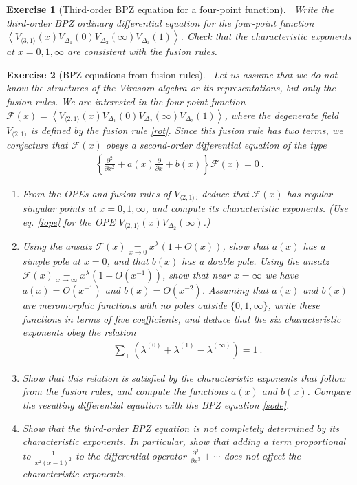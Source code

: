 \documentclass[12pt, a4paper, notitlepage, twoside]{report}
\numberwithin{equation}{section}
\theoremstyle{break}
\newtheorem{exo}{Exercise}[chapter]
\begin{document}
\begin{exo}[Third-order BPZ equation for a four-point function]
 ~\label{exotbf}
 Write the third-order BPZ ordinary differential equation for the four-point function $\left\langle V_{\langle 3,1 \rangle}(x)V_{\Delta_1}(0)V_{\Delta_2}(\infty)V_{\Delta_3}(1)\right\rangle $.
Check that the characteristic exponents at $x=0,1,\infty$ are consistent with the fusion rules. 
\end{exo}

\begin{exo}[BPZ equations from fusion rules]
 ~\label{exoefr}
Let us assume that we do not know the structures of the Virasoro algebra or its representations, but only the fusion rules. We are interested in the four-point function $\mathcal{F}(x) = \left\langle V_{\langle 2,1 \rangle}(x)V_{\Delta_1}(0)V_{\Delta_2}(\infty)V_{\Delta_3}(1)\right\rangle$, where the degenerate field $V_{\langle 2,1 \rangle}$ is defined by the fusion rule \eqref{rot}. Since this fusion rule has two terms, we conjecture that $\mathcal{F}(x)$ obeys a second-order differential equation of the type 
\begin{align}
 \left\{\frac{\partial^2}{\partial x^2} + a(x) \frac{\partial}{\partial x} + b(x) \right\} \mathcal{F}(x) = 0 \ .
\end{align}
\begin{enumerate}
\item From the OPEs and fusion rules of $V_{\langle 2,1\rangle}$, deduce that $\mathcal{F}(x)$ has regular singular points at $x=0,1,\infty$, and compute its characteristic exponents. (Use eq. \eqref{iope} for the OPE $V_{\langle 2,1 \rangle}(x)V_{\Delta_2}(\infty)$.)
\item Using the ansatz $\mathcal{F}(x)\underset{x\to 0}{=}x^\lambda(1+O(x))$, show that $a(x)$ has a simple pole at $x=0$, and that $b(x)$ has a double pole. Using the ansatz $\mathcal{F}(x)\underset{x\to \infty}{=}x^\lambda(1+O(x^{-1}))$, show that near $x=\infty$ we have $a(x)=O(x^{-1})$ and $b(x)= O(x^{-2})$. Assuming that $a(x)$ and $b(x)$ are meromorphic functions with no poles outside $\{0,1,\infty\}$, write these functions in terms of five coefficients, and deduce that the six characteristic exponents obey the relation
\begin{align}
 \sum_\pm \left(\lambda^{(0)}_\pm + \lambda^{(1)}_\pm -\lambda^{(\infty)}_\pm\right) = 1\ .
\end{align}
\item Show that this relation is satisfied by the characteristic exponents that follow from the fusion rules, and compute the functions $a(x)$ and $b(x)$. Compare the resulting differential equation with the BPZ equation \eqref{sode}.
 \item Show that the third-order BPZ equation is not completely determined by its characteristic exponents. In particular, show that adding a term proportional to $\frac{1}{x^2(x-1)^2}$ to the differential operator $\frac{\partial^3}{\partial x^3} + \cdots$ does not affect the characteristic exponents.
\end{enumerate}

\end{exo}
\end{document}
